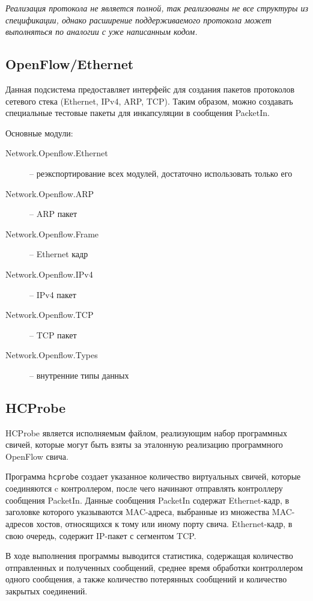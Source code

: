 \documentclass[9pt,a4paper]{article}
\begin{document}
\emph{Реализация протокола не является полной, так реализованы не все структуры
  из спецификации, однако расширение поддерживаемого протокола может
  выполняться по аналогии с уже написанным кодом.}

\subsection{OpenFlow/Ethernet}

Данная подсистема предоставляет интерфейс для создания пакетов протоколов
сетевого стека (Ethernet, IPv4, ARP, TCP). Таким образом, можно создавать
специальные тестовые пакеты для инкапсуляции в сообщения PacketIn.

Основные модули:

\begin{description}
  \item[Network.Openflow.Ethernet] -- реэкспортирование всех модулей, достаточно
    использовать только его
  \item[Network.Openflow.ARP]      -- ARP пакет
  \item[Network.Openflow.Frame]    -- Ethernet кадр
  \item[Network.Openflow.IPv4]     -- IPv4 пакет
  \item[Network.Openflow.TCP]      -- TCP пакет
  \item[Network.Openflow.Types]    -- внутренние типы данных
\end{description}

\subsection{HCProbe}

HCProbe является исполняемым файлом, реализующим набор программных свичей,
которые могут быть взяты за эталонную реализацию программного OpenFlow свича.

Программа \texttt{hcprobe} создает указанное количество виртуальных свичей,
которые соединяются c контроллером, после чего начинают отправлять контроллеру
сообщения PacketIn.  Данные сообщения PacketIn содержат Ethernet-кадр, в
заголовке которого указываются MAC-адреса, выбранные из множества MAC-адресов
хостов, относящихся к тому или иному порту свича.  Ethernet-кадр, в свою
очередь, содержит IP-пакет с сегментом TCP.

В ходе выполнения программы выводится статистика, содержащая количество
отправленных и полученных сообщений, среднее время обработки контроллером одного
сообщения, а также количество потерянных сообщений и количество закрытых
соединений.
\end{document}
